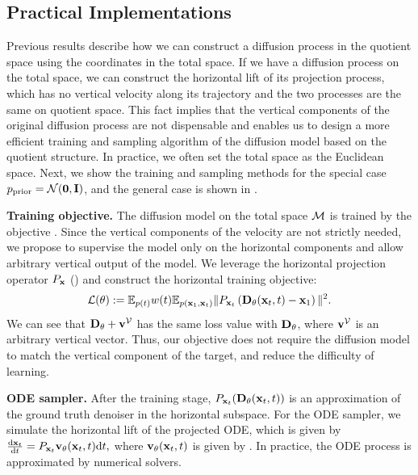 \documentclass{article} %
\newcommand{\prior}{\mathrm{prior}}
\begin{document}
\subsection{Practical Implementations} \label{sec:practice}
Previous results describe how we can construct a diffusion process in the quotient space using the coordinates in the total space. If we have a diffusion process on the total space, we can construct the horizontal lift of its projection process, which has no vertical velocity along its trajectory and the two processes are the same on quotient space. This fact implies that the vertical components of the original diffusion process are not dispensable and enables us to design a more efficient training and sampling algorithm of the diffusion model based on the quotient structure. In practice, we often set the total space as the Euclidean space.
Next, we show the training and sampling methods for the special case $p_\prior=\clN(\bfzro,\bfI)$, and the general case is shown in .

\textbf{Training objective.} The diffusion model on the total space $\mathcal{M}$ is trained by the objective . Since the vertical components of the velocity are not strictly needed, we propose to supervise the model only on the horizontal components and allow arbitrary vertical output of the model. We leverage the horizontal projection operator $P_{\mathbf{x}}$ () and construct the horizontal training objective:
\begin{align}
  \mathcal{L}(\theta) := \mathbb{E}_{p(t)} w(t) \mathbb{E}_{p(\mathbf{x}_1,\mathbf{x}_t)} \Vert P_{\mathbf{x}_t}\left(\mathbf{D}_\theta(\mathbf{x}_t,t)-\mathbf{x}_1\right)\Vert^2.
  \label{eqn:objective-projection}
\end{align}
We can see that $\mathbf{D}_\theta + \mathbf{v}^{\mathcal{V}}$ has the same loss value with $\mathbf{D}_\theta$, where $\mathbf{v}^{\mathcal{V}}$ is an arbitrary vertical vector. Thus, our objective does not require the diffusion model to match the vertical component of the target, and reduce the difficulty of learning.

\textbf{ODE sampler.} After the training stage, $P_{\mathbf{x}_t}(\mathbf{D}_\theta(\mathbf{x}_t,t))$ is an approximation of the ground truth denoiser in the horizontal subspace. For the ODE sampler, we simulate the horizontal lift of the projected ODE, which is given by
    $\frac{\mathrm{d}\mathbf{x}_t}{\mathrm{d} t}=P_{\mathbf{x}_t}\mathbf{v}_\theta(\mathbf{x}_t,t)\mathrm{d} t, $
where $\mathbf{v}_\theta(\mathbf{x}_t,t)$ is given by . In practice, the ODE process is approximated by numerical solvers.
\end{document}
